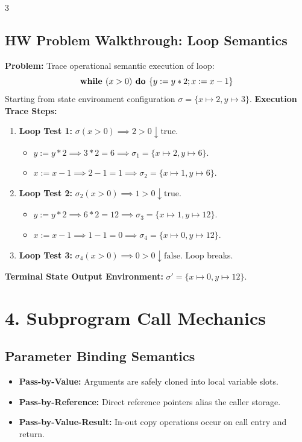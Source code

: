 \documentclass[8.5pt,landscape,a4paper]{article}
\begin{document}
\begin{multicols*}{3}
\subsection{HW Problem Walkthrough: Loop Semantics}
\textbf{Problem:} Trace operational semantic execution of loop:
$$\text{\bf while } (x > 0) \text{\bf\ do } \{ y := y * 2; x := x - 1 \}$$
Starting from state environment configuration $\sigma = \{x \mapsto 2, y \mapsto 3\}$.
\textbf{Execution Trace Steps:}
\begin{enumerate}
    \item \textbf{Loop Test 1:} $\sigma(x > 0) \implies 2 > 0 \downarrow \text{true}$.
    \begin{itemize}
        \item $y := y * 2 \implies 3 * 2 = 6 \implies \sigma_1 = \{x \mapsto 2, y \mapsto 6\}$.
        \item $x := x - 1 \implies 2 - 1 = 1 \implies \sigma_2 = \{x \mapsto 1, y \mapsto 6\}$.
    \end{itemize}
    \item \textbf{Loop Test 2:} $\sigma_2(x > 0) \implies 1 > 0 \downarrow \text{true}$.
    \begin{itemize}
        \item $y := y * 2 \implies 6 * 2 = 12 \implies \sigma_3 = \{x \mapsto 1, y \mapsto 12\}$.
        \item $x := x - 1 \implies 1 - 1 = 0 \implies \sigma_4 = \{x \mapsto 0, y \mapsto 12\}$.
    \end{itemize}
    \item \textbf{Loop Test 3:} $\sigma_4(x > 0) \implies 0 > 0 \downarrow \text{false}$. Loop breaks.
\end{enumerate}
\textbf{Terminal State Output Environment:} $\sigma' = \{x \mapsto 0, y \mapsto 12\}$.

\section{4. Subprogram Call Mechanics}
\subsection{Parameter Binding Semantics}
\begin{itemize}
    \item \textbf{Pass-by-Value:} Arguments are safely cloned into local variable slots.
    \item \textbf{Pass-by-Reference:} Direct reference pointers alias the caller storage.
    \item \textbf{Pass-by-Value-Result:} In-out copy operations occur on call entry and return.
\end{itemize}


\end{multicols*}
\end{document}
